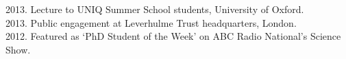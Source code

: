 \documentclass[a4paper, oneside, final]{scrartcl} %
\begin{document}
\begin{center}
\begin{flushleft}
\begin{flushleft}

2013. Lecture to UNIQ Summer School students, University of Oxford.\\

2013. Public engagement at Leverhulme Trust headquarters, London.\\

2012. Featured as `PhD Student of the Week' on ABC Radio National's Science Show.\\


\end{flushleft}




%
%
%
%

\end{flushleft}



\end{center}
\end{document}
